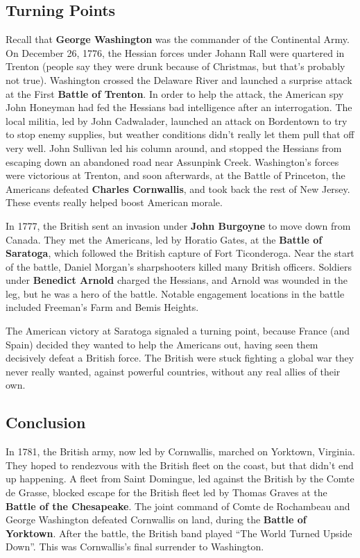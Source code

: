 \subsection*{Turning Points}

Recall that \textbf{George Washington} was the commander of the Continental Army.
On December 26, 1776, the Hessian forces under Johann Rall were quartered in Trenton
(people say they were drunk because of Christmas, but that's probably not true).
Washington crossed the Delaware River and launched a surprise attack at the First \textbf{Battle of Trenton}.
In order to help the attack,
the American spy John Honeyman had fed the Hessians bad intelligence after an interrogation.
The local militia, led by John Cadwalader, launched an attack on Bordentown to try to stop enemy supplies,
but weather conditions didn't really let them pull that off very well.
John Sullivan led his column around,
and stopped the Hessians from escaping down an abandoned road near Assunpink Creek.
Washington's forces were victorious at Trenton,
and soon afterwards, at the Battle of Princeton, the Americans defeated \textbf{Charles Cornwallis},
and took back the rest of New Jersey.
These events really helped boost American morale.

In 1777, the British sent an invasion under \textbf{John Burgoyne} to move down from Canada.
They met the Americans, led by Horatio Gates, at the \textbf{Battle of Saratoga},
which followed the British capture of Fort Ticonderoga.
Near the start of the battle, Daniel Morgan's sharpshooters killed many British officers.
Soldiers under \textbf{Benedict Arnold} charged the Hessians,
and Arnold was wounded in the leg, but he was a hero of the battle.
Notable engagement locations in the battle included Freeman's Farm and Bemis Heights.

The American victory at Saratoga signaled a turning point,
because France (and Spain) decided they wanted to help the Americans out,
having seen them decisively defeat a British force.
The British were stuck fighting a global war they never really wanted,
against powerful countries, without any real allies of their own.

\subsection*{Conclusion}

In 1781, the British army, now led by Cornwallis, marched on Yorktown, Virginia.
They hoped to rendezvous with the British fleet on the coast,
but that didn't end up happening.
A fleet from Saint Domingue, led against the British by the Comte de Grasse, blocked escape for the
British fleet led by Thomas Graves at the \textbf{Battle of the Chesapeake}.
The joint command of Comte de Rochambeau and George Washington defeated Cornwallis
on land, during the \textbf{Battle of Yorktown}.
After the battle, the British band played ``The World Turned Upside Down''.
This was Cornwallis's final surrender to Washington.

